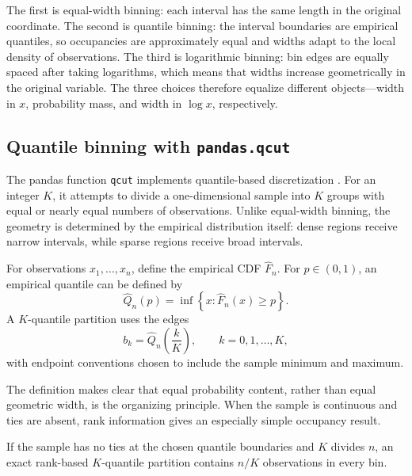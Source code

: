 The first is equal-width binning: each interval has the same length in the original coordinate. The second is quantile binning: the interval boundaries are empirical quantiles, so occupancies are approximately equal and widths adapt to the local density of observations. The third is logarithmic binning: bin edges are equally spaced after taking logarithms, which means that widths increase geometrically in the original variable. The three choices therefore equalize different objects---width in $x$, probability mass, and width in $\log x$, respectively.

\subsection{Quantile binning with \texttt{pandas.qcut}}

The pandas function \texttt{qcut} implements quantile-based discretization \cite{PandasQcut}. For an integer $K$, it attempts to divide a one-dimensional sample into $K$ groups with equal or nearly equal numbers of observations. Unlike equal-width binning, the geometry is determined by the empirical distribution itself: dense regions receive narrow intervals, while sparse regions receive broad intervals.

\begin{definition}
For observations $x_1,\ldots,x_n$, define the empirical CDF $\widehat F_n$. For $p\in(0,1)$, an empirical quantile can be defined by
\begin{equation}
 \widehat Q_n(p)=\inf\left\{x:\widehat F_n(x)\geq p\right\}.
\end{equation}
A $K$-quantile partition uses the edges
\begin{equation}
 b_k=\widehat Q_n\left(\frac{k}{K}\right),
 \qquad k=0,1,\ldots,K,
\end{equation}
with endpoint conventions chosen to include the sample minimum and maximum.
\end{definition}

The definition makes clear that equal probability content, rather than equal geometric width, is the organizing principle. When the sample is continuous and ties are absent, rank information gives an especially simple occupancy result.

\begin{proposition}
If the sample has no ties at the chosen quantile boundaries and $K$ divides $n$, an exact rank-based $K$-quantile partition contains $n/K$ observations in every bin.
\end{proposition}

